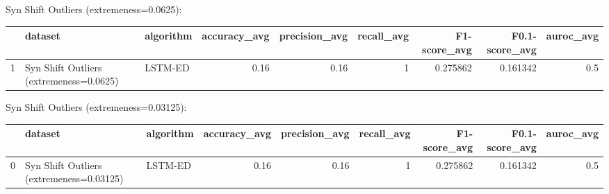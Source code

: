 Syn Shift Outliers (extremeness=0.0625):

\begin{tabular}{rllrrrrrr}
\hline
    & dataset                                 & algorithm   &   accuracy\_avg &   precision\_avg &   recall\_avg &   F1-score\_avg &   F0.1-score\_avg &   auroc\_avg \\
\hline
  1 & Syn Shift Outliers (extremeness=0.0625) & LSTM-ED     &           0.16 &            0.16 &            1 &       0.275862 &         0.161342 &         0.5 \\
\hline
\end{tabular}

Syn Shift Outliers (extremeness=0.03125):

\begin{tabular}{rllrrrrrr}
\hline
    & dataset                                  & algorithm   &   accuracy\_avg &   precision\_avg &   recall\_avg &   F1-score\_avg &   F0.1-score\_avg &   auroc\_avg \\
\hline
  0 & Syn Shift Outliers (extremeness=0.03125) & LSTM-ED     &           0.16 &            0.16 &            1 &       0.275862 &         0.161342 &         0.5 \\
\hline
\end{tabular}

